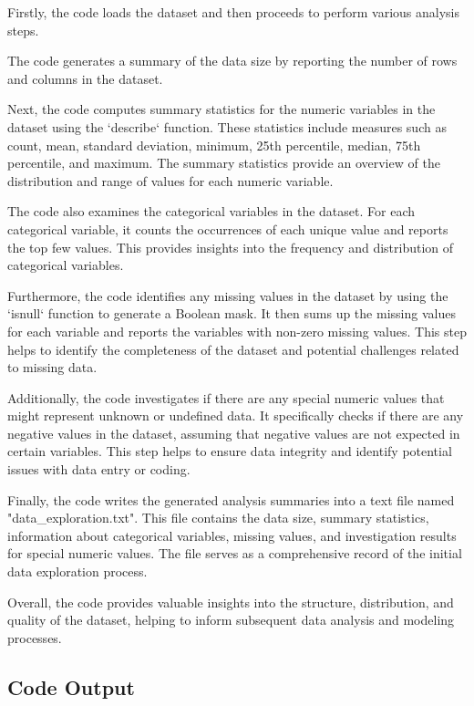 \documentclass[11pt]{article}
\begin{document}
Firstly, the code loads the dataset and then proceeds to perform various analysis steps.

The code generates a summary of the data size by reporting the number of rows and columns in the dataset.

Next, the code computes summary statistics for the numeric variables in the dataset using the `describe` function. These statistics include measures such as count, mean, standard deviation, minimum, 25th percentile, median, 75th percentile, and maximum. The summary statistics provide an overview of the distribution and range of values for each numeric variable.

The code also examines the categorical variables in the dataset. For each categorical variable, it counts the occurrences of each unique value and reports the top few values. This provides insights into the frequency and distribution of categorical variables.

Furthermore, the code identifies any missing values in the dataset by using the `isnull` function to generate a Boolean mask. It then sums up the missing values for each variable and reports the variables with non-zero missing values. This step helps to identify the completeness of the dataset and potential challenges related to missing data.

Additionally, the code investigates if there are any special numeric values that might represent unknown or undefined data. It specifically checks if there are any negative values in the dataset, assuming that negative values are not expected in certain variables. This step helps to ensure data integrity and identify potential issues with data entry or coding.

Finally, the code writes the generated analysis summaries into a text file named "data\_exploration.txt". This file contains the data size, summary statistics, information about categorical variables, missing values, and investigation results for special numeric values. The file serves as a comprehensive record of the initial data exploration process.

Overall, the code provides valuable insights into the structure, distribution, and quality of the dataset, helping to inform subsequent data analysis and modeling processes.

\subsection{Code Output}
\end{document}
